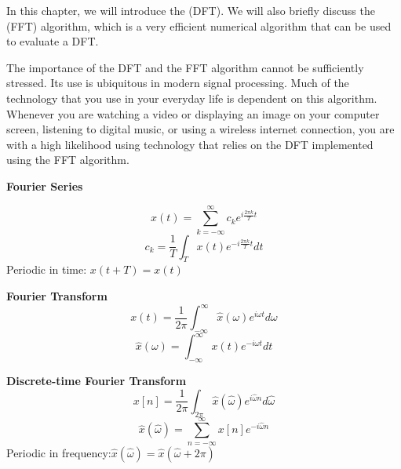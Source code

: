 In this chapter, we will introduce the \emph{} (DFT). We will also briefly
discuss the \emph{} (FFT) algorithm,
which is a very efficient numerical algorithm that can be used to evaluate a DFT.

The importance of the DFT and the FFT algorithm cannot be sufficiently
stressed. Its use is ubiquitous in modern signal processing. Much of
the technology that you use in your everyday life is dependent on this
algorithm. Whenever you are watching a video or displaying an image on
your computer screen, listening to digital music, or using a wireless
internet connection, you are with a high likelihood using technology
that relies on the DFT implemented using the FFT algorithm.
\begin{marginfigure}
  \hrulefill \newline

  \noindent \textbf{Fourier Series}\newline

  \begin{equation*}
    x(t)=\sum_{k=-\infty}^{\infty} c_k e^{i \frac{2\pi k}{T} t}
  \end{equation*}
  \begin{equation*}
    c_k=\frac{1}{T}\int_{T} x(t) e^{-i \frac{2\pi k}{T}  t} dt
  \end{equation*}
  Periodic in time: \newline $x(t+T)=x(t)$\newline

  \noindent \hrulefill
  \newline
  \noindent \textbf{Fourier Transform}
  \newline
  \begin{equation*}
    x(t) = \frac{1}{2\pi}\int_{-\infty}^{\infty} \hat{x}(\omega) e^{i\omega t} d\omega
  \end{equation*}
  \begin{equation*}
    \hat{x}(\omega) = \int_{-\infty}^{\infty} x(t) e^{-i\omega t} dt
  \end{equation*}
  \newline
  \noindent \hrulefill
  \newline

  \noindent \textbf{Discrete-time Fourier Transform}
  \newline
  \begin{equation*}
    x[n] = \frac{1}{2\pi} \int_{2\pi} \hat{x}(\hat{\omega}) e^{i\hat{\omega} n} d\hat{\omega}
  \end{equation*}
  \begin{equation*}
    \hat{x}(\hat{\omega}) = \sum_{n=-\infty}^{\infty} x[n] e^{-i\hat{\omega} n}
  \end{equation*}
  Periodic in frequency:\newline $\hat{x}(\hat{\omega}) = \hat{x}(\hat{\omega}+2\pi)$
  \newline
  \noindent \hrulefill


\end{marginfigure}
